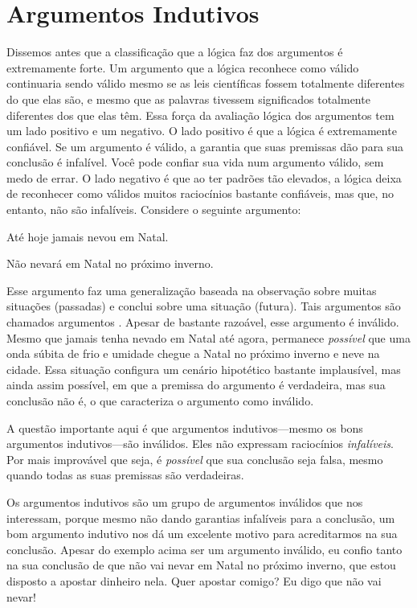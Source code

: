 \section{Argumentos Indutivos}
Dissemos antes que a classificação que a lógica faz dos argumentos é extremamente forte. 
Um argumento que a lógica reconhece como válido continuaria sendo válido mesmo se as leis científicas fossem totalmente diferentes do que elas são, e mesmo que as palavras tivessem significados totalmente diferentes dos que elas têm.
Essa força da avaliação lógica dos argumentos tem um lado positivo e um negativo.
O lado positivo é que a lógica é extremamente confiável.
Se um argumento é válido, a garantia que suas premissas dão para sua conclusão é infalível.
Você pode confiar sua vida num argumento válido, sem medo de errar.
O lado negativo é que ao ter padrões tão elevados, a lógica deixa de reconhecer como válidos muitos raciocínios bastante confiáveis, mas que, no entanto, não são infalíveis.
Considere o seguinte argumento:
	\begin{earg}
		\item[] Até hoje jamais nevou em Natal.
	\item[\therefore] Não nevará em Natal no próximo inverno.
\end{earg}
Esse argumento faz uma generalização baseada na observação sobre muitas situações (passadas) e conclui sobre uma situação (futura).
Tais argumentos são chamados argumentos .
Apesar de bastante razoável, esse argumento é inválido.
Mesmo que jamais tenha nevado em Natal até agora, permanece \emph{possível} que 
uma onda súbita de frio e umidade chegue a Natal no próximo inverno e neve na cidade.
Essa situação configura um cenário hipotético bastante implausível, mas ainda assim possível, em que a premissa do argumento é verdadeira, mas sua conclusão não é, o que caracteriza o argumento como inválido.

A questão importante aqui é que argumentos indutivos---mesmo os bons argumentos indutivos---são inválidos.
Eles não expressam raciocínios  \emph{infalíveis}.
Por mais improvável que seja, é \emph{possível} que sua conclusão seja falsa, mesmo quando todas as suas premissas são verdadeiras.

Os argumentos indutivos são um grupo de argumentos inválidos que nos interessam, porque mesmo não dando garantias infalíveis para a conclusão, um bom argumento indutivo nos dá um excelente motivo para acreditarmos na sua conclusão.
Apesar do exemplo acima ser um argumento inválido, eu confio tanto na sua conclusão de que não vai nevar em Natal no próximo inverno, que estou disposto a apostar dinheiro nela. Quer apostar comigo? Eu digo que não vai nevar!

